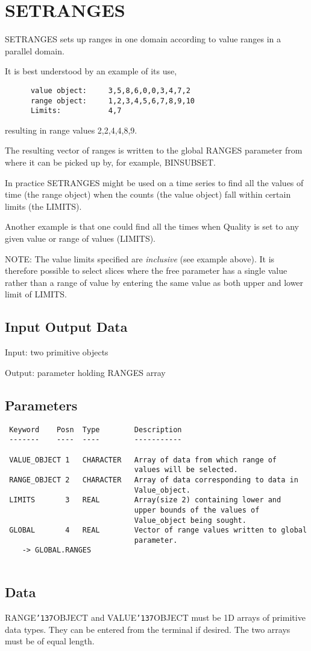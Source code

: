 \documentclass{book}
\renewcommand{\_}{{\tt\char'137}}     %
\begin{document}
\section{SETRANGES}
SETRANGES sets up ranges in one domain according to value ranges
in a parallel domain.
 
It is best understood by an example of its use,
\begin{verbatim}
      value object:     3,5,8,6,0,0,3,4,7,2
      range object:     1,2,3,4,5,6,7,8,9,10
      Limits:           4,7
\end{verbatim}
resulting in range values 2,2,4,4,8,9.
 
The resulting vector of ranges is written to the global RANGES
parameter from where it can be picked up by, for example, BINSUBSET.
 
In practice SETRANGES might be used on a time series to find all
the values of time (the range object) when the counts (the
value object) fall within certain limits (the LIMITS).
 
Another example is that one could find all the times
when Quality is set to any given
value or range of values (LIMITS).
 
NOTE: The value limits specified are {\em inclusive} (see
example above). It is therefore possible to
select slices where the free parameter has a
single value rather than a range of value by
entering the same value as both upper and lower
limit of LIMITS.
\subsection{Input Output Data}
Input: two primitive objects
 
Output: parameter holding RANGES array
 
\subsection{Parameters}
\begin{verbatim}
 Keyword    Posn  Type        Description
 -------    ----  ----        -----------
 
 VALUE_OBJECT 1   CHARACTER   Array of data from which range of
                              values will be selected.
 RANGE_OBJECT 2   CHARACTER   Array of data corresponding to data in
                              Value_object.
 LIMITS       3   REAL        Array(size 2) containing lower and
                              upper bounds of the values of
                              Value_object being sought.
 GLOBAL       4   REAL        Vector of range values written to global
                              parameter.
    -> GLOBAL.RANGES
 
\end{verbatim}\subsection{Data}
RANGE\_OBJECT and VALUE\_OBJECT must be 1D arrays of primitive data
types. They can be entered from the terminal if desired. The two
arrays must be of equal length.
 
\end{document}
